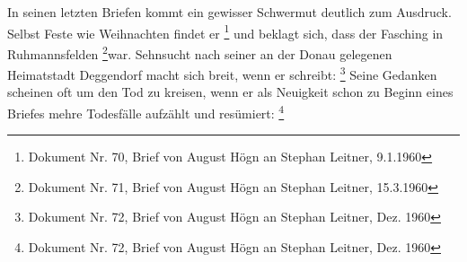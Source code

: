 In seinen letzten Briefen kommt ein gewisser Schwermut deutlich zum
Ausdruck. Selbst Feste wie Weihnachten findet er
 \footnote{Dokument
Nr. 70, Brief von August Högn an Stephan Leitner, 9.1.1960} und beklagt
sich, dass der Fasching in Ruhmannsfelden  \footnote{Dokument Nr. 71, Brief von
August Högn an Stephan Leitner, 15.3.1960}\zitat{ }war.
Sehnsucht nach seiner an der Donau gelegenen Heimatstadt Deggendorf
macht sich breit, wenn er schreibt: \footnote{
Dokument Nr. 72, Brief von August Högn an Stephan Leitner, Dez. 1960}
Seine Gedanken scheinen oft um den Tod zu kreisen, wenn er als
Neuigkeit schon zu Beginn eines Briefes mehre Todesfälle aufzählt und
resümiert:  \footnote{Dokument Nr. 72, Brief von August Högn an
Stephan Leitner, Dez. 1960}

